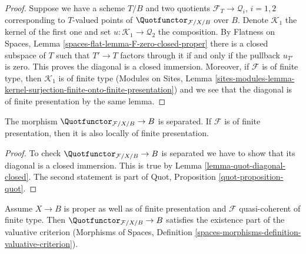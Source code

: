 \begin{proof}
Suppose we have a scheme $T/B$ and two quotients
$\mathcal{F}_T \to \mathcal{Q}_i$, $i = 1, 2$ corresponding
to $T$-valued points of $\Quotfunctor_{\mathcal{F}/X/B}$ over $B$.
Denote $\mathcal{K}_1$ the kernel of the first one and set
$u : \mathcal{K}_1 \to \mathcal{Q}_2$ the composition.
By Flatness on Spaces, Lemma \ref{spaces-flat-lemma-F-zero-closed-proper}
there is a closed subspace of $T$ such that $T' \to T$
factors through it if and only if the pullback $u_{T'}$ is zero.
This proves the diagonal is a closed immersion.
Moreover, if $\mathcal{F}$ is of finite type, then
$\mathcal{K}_1$ is of finite type
(Modules on Sites, Lemma
\ref{sites-modules-lemma-kernel-surjection-finite-onto-finite-presentation})
and we see that the diagonal is of finite presentation by
the same lemma.
\end{proof}

\begin{lemma}
\label{lemma-quot-s-lfp}
The morphism $\Quotfunctor_{\mathcal{F}/X/B} \to B$ is separated.
If $\mathcal{F}$ is of finite presentation, then it is also
locally of finite presentation.
\end{lemma}

\begin{proof}
To check $\Quotfunctor_{\mathcal{F}/X/B} \to B$ is separated we have to
show that its diagonal is a closed immersion. This
is true by Lemma \ref{lemma-quot-diagonal-closed}.
The second statement is part of
Quot, Proposition \ref{quot-proposition-quot}.
\end{proof}

\begin{lemma}
\label{lemma-quot-existence-part}
Assume $X \to B$ is proper as well as of finite presentation
and $\mathcal{F}$ quasi-coherent of finite type.
Then $\Quotfunctor_{\mathcal{F}/X/B} \to B$ satisfies the existence part
of the valuative criterion (Morphisms of Spaces, Definition
\ref{spaces-morphisms-definition-valuative-criterion}).
\end{lemma}

